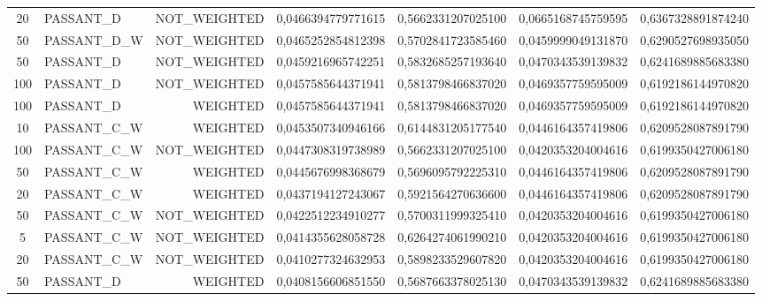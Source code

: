 \begin{table}[H]
{\begin{tabular}{ c l r c c c c }
				20 &  PASSANT\_D & NOT\_WEIGHTED & 0,0466394779771615 & 0,5662331207025100 & 0,0665168745759595 & 0,6367328891874240 \\
				
				50 & PASSANT\_D\_W & NOT\_WEIGHTED & 0,0465252854812398 & 0,5702841723585460 & 0,0459999049131870 & 0,6290527698935050 \\
				
				50 &  PASSANT\_D & NOT\_WEIGHTED & 0,0459216965742251 & 0,5832685257193640 & 0,0470343539139832 & 0,6241689885683380 \\
				
				100 &  PASSANT\_D & NOT\_WEIGHTED & 0,0457585644371941 & 0,5813798466837020 & 0,0469357759595009 & 0,6192186144970820 \\
				
				100 &  PASSANT\_D &   WEIGHTED & 0,0457585644371941 & 0,5813798466837020 & 0,0469357759595009 & 0,6192186144970820 \\
				
				10 & PASSANT\_C\_W &   WEIGHTED & 0,0453507340946166 & 0,6144831205177540 & 0,0446164357419806 & 0,6209528087891790 \\
				
				100 & PASSANT\_C\_W & NOT\_WEIGHTED & 0,0447308319738989 & 0,5662331207025100 & 0,0420353204004616 & 0,6199350427006180 \\
				
				50 & PASSANT\_C\_W &   WEIGHTED & 0,0445676998368679 & 0,5696095792225310 & 0,0446164357419806 & 0,6209528087891790 \\
				
				20 & PASSANT\_C\_W &   WEIGHTED & 0,0437194127243067 & 0,5921564270636600 & 0,0446164357419806 & 0,6209528087891790 \\
				
				50 & PASSANT\_C\_W & NOT\_WEIGHTED & 0,0422512234910277 & 0,5700311999325410 & 0,0420353204004616 & 0,6199350427006180 \\
				
				5 & PASSANT\_C\_W & NOT\_WEIGHTED & 0,0414355628058728 & 0,6264274061990210 & 0,0420353204004616 & 0,6199350427006180 \\
				
				20 & PASSANT\_C\_W & NOT\_WEIGHTED & 0,0410277324632953 & 0,5898233529607820 & 0,0420353204004616 & 0,6199350427006180 \\
				
				50 &  PASSANT\_D &   WEIGHTED & 0,0408156606851550 & 0,5687663378025130 & 0,0470343539139832 & 0,6241689885683380 \\
				

\end{tabular}}
\end{table}
